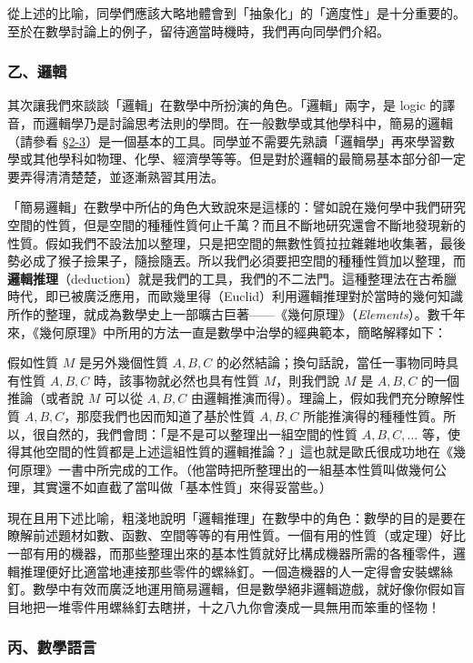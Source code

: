 從上述的比喻，同學們應該大略地體會到「抽象化」的「適度性」是十分重要的。至於在數學討論上的例子，留待適當時機時，我們再向同學們介紹。

\subsubsection*{乙、邏輯}\label{subsec:logic}

其次讓我們來談談「邏輯」在數學中所扮演的角色。「邏輯」兩字，是 logic 的譯音，而邏輯學乃是討論思考法則的學問。在一般數學或其他學科中，簡易的邏輯（請參看 \hyperref[sec:2-3]{\S 2-3}）是一個基本的工具。同學並不需要先熟讀「邏輯學」再來學習數學或其他學科如物理、化學、經濟學等等。但是對於邏輯的最簡易基本部分卻一定要弄得清清楚楚，並逐漸熟習其用法。

「簡易邏輯」在數學中所佔的角色大致說來是這樣的：譬如說在幾何學中我們研究空間的性質，但是空間的種種性質何止千萬？而且不斷地研究還會不斷地發現新的性質。假如我們不設法加以整理，只是把空間的無數性質拉拉雜雜地收集著，最後勢必成了猴子撿果子，隨撿隨丟。所以我們必須要把空間的種種性質加以整理，而\textbf{邏輯推理}（deduction）就是我們的工具，我們的不二法門。這種整理法在古希臘時代，即已被廣泛應用，而歐幾里得（Euclid）利用邏輯推理對於當時的幾何知識所作的整理，就成為數學史上一部曠古巨著——《幾何原理》（\textit{Elements}）。數千年來，《幾何原理》中所用的方法一直是數學中治學的經典範本，簡略解釋如下：

假如性質 $M$ 是另外幾個性質 $A, B, C$ 的必然結論；換句話說，當任一事物同時具有性質 $A, B, C$ 時，該事物就必然也具有性質 $M$，則我們說 $M$ 是 $A, B, C$ 的一個推論（或者說 $M$ 可以從 $A, B, C$ 由邏輯推演而得）。理論上，假如我們充分瞭解性質 $A, B, C$，那麼我們也因而知道了基於性質 $A, B, C$ 所能推演得的種種性質。所以，很自然的，我們會問：「是不是可以整理出一組空間的性質 $A, B, C, \dots$ 等，使得其他空間的性質都是上述這組性質的邏輯推論？」這也就是歐氏很成功地在《幾何原理》一書中所完成的工作。（他當時把所整理出的一組基本性質叫做幾何公理，其實還不如直截了當叫做「基本性質」來得妥當些。）

現在且用下述比喻，粗淺地說明「邏輯推理」在數學中的角色：數學的目的是要在瞭解前述題材如數、函數、空間等等的有用性質。一個有用的性質（或定理）好比一部有用的機器，而那些整理出來的基本性質就好比構成機器所需的各種零件，邏輯推理便好比適當地連接那些零件的螺絲釘。一個造機器的人一定得會安裝螺絲釘。數學中有效而廣泛地運用簡易邏輯，但是數學絕非邏輯遊戲，就好像你假如盲目地把一堆零件用螺絲釘去瞎拼，十之八九你會湊成一具無用而笨重的怪物！

\subsubsection*{丙、數學語言}\label{subsec:math_language}

